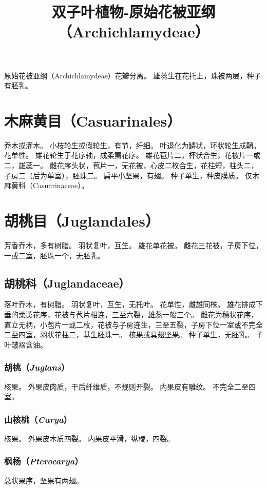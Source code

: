 \documentclass[11pt]{article}
\title{双子叶植物-原始花被亚纲（Archichlamydeae）}
\author{}
\date{}
\begin{document}
\begin{sloppypar}
  \maketitle

  \linenumbers
原始花被亚纲（Archichlamydeae）花瓣分离。
雄蕊生在花托上，珠被两层，种子有胚乳。

\section{木麻黄目（Casuarinales）}
乔木或灌木。
小枝轮生或假轮生，有节，纤细。
叶退化为鳞状，环状轮生成鞘。
花单性。
雄花轮生于花序轴，成柔荑花序。
雄花苞片二，杯状合生，花被片一或二，雄蕊一。
雌花序头状，苞片一，无花被，心皮二枚合生，花柱短，柱头二，子房二（后为单室），胚珠二。
扁平小坚果，有翅。
种子单生，种皮膜质。
仅木麻黄科（Casuarinaceae）。

\section{胡桃目（Juglandales）}
芳香乔木，多有树脂。
羽状复叶，互生。
雄花单花被。
雌花三花被，子房下位，一或二室，胚珠一个，无胚乳。

\subsection{胡桃科（Juglandaceae）}
落叶乔木，有树脂。
羽状复叶，互生，无托叶。
花单性，雌雄同株。
雄花排成下垂的柔荑花序，花被与苞片相连，三至六裂，雄蕊一般三个。
雌花为穗状花序，直立无柄，小苞片一或二枚，花被与子房连生，三至五裂，子房下位一室或不完全二至四室，羽状花柱二，基生胚珠一。
核果或具翅坚果。
种子单生，无胚乳。
子叶皱褶含油。

\subsubsection{胡桃（\textit{Juglans}）}
核果。
外果皮肉质，干后纤维质，不规则开裂。
内果皮有雕纹。
不完全二至四室。

\subsubsection{山核桃（\textit{Carya}）}
核果。
外果皮木质四裂。
内果皮平滑，纵棱，四裂。

\subsubsection{枫杨（\textit{Pterocarya}）}
总状果序，坚果有两翅。


\end{sloppypar}
\end{document}
